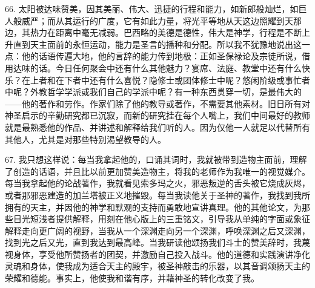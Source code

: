 66. 太阳被达味赞美，因其美丽、伟大、迅捷的行程和能力，如新郎般灿烂，如巨人般威严；而从其运行的广度，它有如此力量，将光平等地从天这边照耀到天那边，其热力在距离中毫无减弱。巴西略的美德是德性，伟大是神学，行程是不断上升直到天主面前的永恒运动，能力是圣言的播种和分配。所以我不犹豫地说出这一点：他的话语传遍大地，他的言辞的能力传到地极：正如圣保禄论及宗徒所说，借用达味的话。今日任何聚会中还有什么其他魅力？宴席、法庭、教堂中还有什么快乐？在上者和在下者中还有什么喜悦？隐修士或团体修士中呢？悠闲阶级或事忙者中呢？外教哲学学派或我们自己的学派中呢？有一种东西贯穿一切，是最伟大的——他的著作和劳作。作家们除了他的教导或著作，不需要其他素材。旧日所有对神圣启示的辛勤研究都已沉寂，而新的研究挂在每个人嘴上，我们中间最好的教师就是最熟悉他的作品、并讲述和解释给我们听的人。因为仅他一人就足以代替所有其他人，尤其是对那些特别渴望教导的人。\par

67. 我只想这样说：每当我拿起他的，口诵其词时，我就被带到造物主面前，理解了创造的话语，并且比以前更加赞美造物主，将我的老师作为我唯一的视觉媒介。每当我拿起他的论战著作，我就看见索多玛之火，邪恶叛逆的舌头被它烧成灰烬，或者那邪恶建造的加兰塔被正义地摧毁。每当我读他关于圣神的著作，我找到我所拥有的天主，并因他的神学和默观的支持而勇敢地宣讲真理。他的其他论文，为那些目光短浅者提供解释，用刻在他心版上的三重铭文，引导我从单纯的字面或象征解释走向更广阔的视野，当我从一个深渊走向另一个深渊，呼唤深渊之后又深渊，找到光之后又光，直到我达到最高峰。当我研读他颂扬我们斗士的赞美辞时，我蔑视身体，享受他所赞扬者的团契，并激励自己投入战斗。他的道德和实践演讲净化灵魂和身体，使我成为适合天主的殿宇，被圣神敲击的乐器，以其音调颂扬天主的荣耀和德能。事实上，他使我和谐有序，并藉神圣的转化改变了我。\par

